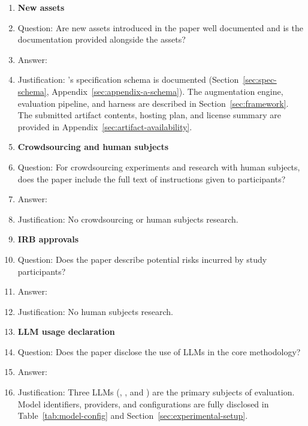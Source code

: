 {\begin{enumerate}
\item {\bf New assets}
    \item[] Question: Are new assets introduced in the paper well documented and is the documentation provided alongside the assets?
    \item[] Answer: \answerYes{}
    \item[] Justification: \parbench{}'s specification schema is documented (Section~\ref{sec:spec-schema}, Appendix~\ref{sec:appendix-a-schema}). The augmentation engine, evaluation pipeline, and harness are described in Section~\ref{sec:framework}. The submitted artifact contents, hosting plan, and license summary are provided in Appendix~\ref{sec:artifact-availability}.
 
\item {\bf Crowdsourcing and human subjects}
    \item[] Question: For crowdsourcing experiments and research with human subjects, does the paper include the full text of instructions given to participants?
    \item[] Answer: \answerNA{}
    \item[] Justification: No crowdsourcing or human subjects research.

\item {\bf IRB approvals}
    \item[] Question: Does the paper describe potential risks incurred by study participants?
    \item[] Answer: \answerNA{}
    \item[] Justification: No human subjects research.

\item {\bf LLM usage declaration}
    \item[] Question: Does the paper disclose the use of LLMs in the core methodology?
    \item[] Answer: \answerYes{}
    \item[] Justification: Three LLMs (\qwen{}, \gptnew{}, and \codex{}) are the primary subjects of evaluation. Model identifiers, providers, and configurations are fully disclosed in Table~\ref{tab:model-config} and Section~\ref{sec:experimental-setup}.

\end{enumerate}
}
